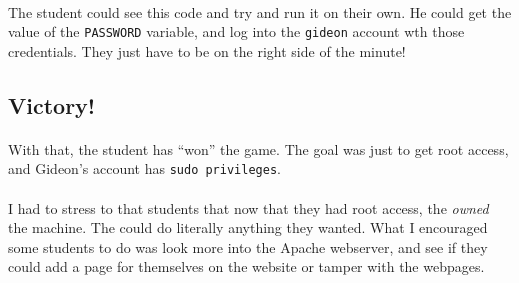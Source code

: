 \documentclass[11pt]{article}
\begin{document}
	\paragraph{} The student could see this code and try and run it on their own. He could get the value of the \texttt{PASSWORD} variable, and log into the \texttt{gideon} account wth those credentials. They just have to be on the right side of the minute!

	\begin{center}
		\graphicspath{ {.} }
		\centering
	\end{center}

	\begin{center}
		\graphicspath{ {.} }
		\centering
	\end{center}

	\newpage

	\subsection{Victory!}

	\paragraph{} With that, the student has ``won'' the game. The goal was just to get root access, and Gideon's account has \texttt{sudo privileges}.

	\paragraph{} I had to stress to that students that now that they had root access, the \textit{owned} the machine. The could do literally anything they wanted. What I encouraged some students to do was look more into the Apache webserver, and see if they could add a page for themselves on the website or tamper with the webpages.
\end{document}
